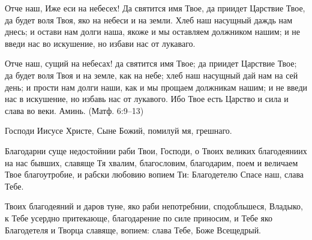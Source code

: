 

\label{_content_molitvi}

 

 
{\noparindent\begin{minipage}{\textwidth}

\restoreparindent


Отче наш, Иже еси на небесех! Да святится имя Твое, да приидет Царствие Твое, да будет воля Твоя, яко на небеси и на земли. Хлеб наш насущный даждь нам днесь; и остави нам долги наша, якоже и мы оставляем должником нашим; и не введи нас во искушение, но избави нас от лукаваго.


Отче наш, сущий на небесах! да святится имя Твое; да приидет Царствие Твое; да будет воля Твоя и на земле, как на небе; хлеб наш насущный дай нам на сей день; и прости нам долги наши, как и мы прощаем должникам нашим; и не введи нас в искушение, но избавь нас от лукавого. Ибо Твое есть Царство и сила и слава во веки. Аминь. (Матф. 6:9--13)\end{minipage}}\mychapterending

 

\begin{center}
Господи Иисусе Христе, Сыне Божий, помилуй мя, грешнаго. 
\end{center}
\mychapterending

 



Благодарни суще недостойнии раби Твои, Господи, о Твоих великих благодеяниих на нас бывших, славяще Тя хвалим, благословим, благодарим, поем и величаем Твое благоутробие, и рабски любовию вопием Ти: Благодетелю Спасе наш, слава Тебе.






Твоих благодеяний и даров туне, яко раби непотребнии, сподобльшеся, Владыко, к Тебе усердно притекающе, благодарение по силе приносим, и Тебе яко Благодетеля и Творца славяще, вопием: слава Тебе, Боже Всещедрый.


